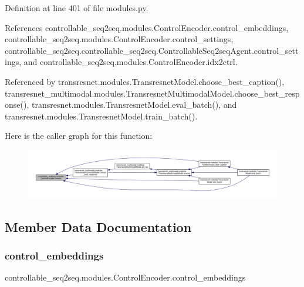 Definition at line 401 of file modules.\+py.



References controllable\+\_\+seq2seq.\+modules.\+Control\+Encoder.\+control\+\_\+embeddings, controllable\+\_\+seq2seq.\+modules.\+Control\+Encoder.\+control\+\_\+settings, controllable\+\_\+seq2seq.\+controllable\+\_\+seq2seq.\+Controllable\+Seq2seq\+Agent.\+control\+\_\+settings, and controllable\+\_\+seq2seq.\+modules.\+Control\+Encoder.\+idx2ctrl.



Referenced by transresnet.\+modules.\+Transresnet\+Model.\+choose\+\_\+best\+\_\+caption(), transresnet\+\_\+multimodal.\+modules.\+Transresnet\+Multimodal\+Model.\+choose\+\_\+best\+\_\+response(), transresnet.\+modules.\+Transresnet\+Model.\+eval\+\_\+batch(), and transresnet.\+modules.\+Transresnet\+Model.\+train\+\_\+batch().

Here is the caller graph for this function\+:
\nopagebreak
\begin{figure}[H]
\begin{center}
\leavevmode
\includegraphics[width=350pt]{classcontrollable__seq2seq_1_1modules_1_1ControlEncoder_ae678ed4e13762eb620c918f32de0ca11_icgraph}
\end{center}
\end{figure}


\subsection{Member Data Documentation}
\mbox{\label{classcontrollable__seq2seq_1_1modules_1_1ControlEncoder_a332c9792eac6f124ed071429fb4403ff}} 
\subsubsection{\texorpdfstring{control\+\_\+embeddings}{control\_embeddings}}
{\footnotesize\ttfamily controllable\+\_\+seq2seq.\+modules.\+Control\+Encoder.\+control\+\_\+embeddings}



